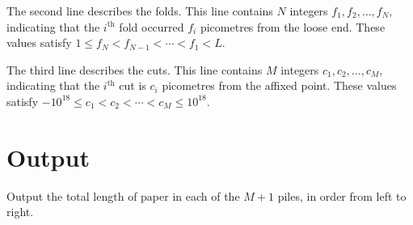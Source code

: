 The second line describes the folds. This line contains $N$ integers
$f_1, f_2, \ldots, f_N$, indicating that the $i^\textrm{th}$ fold occurred $f_i$ picometres from the loose end. These values satisfy $1 \leq f_N < f_{N-1} < \cdots < f_1 < L$.

The third line describes the cuts. This line contains $M$ integers
$c_1, c_2, \ldots, c_M$, indicating that the $i^\textrm{th}$ cut is $c_i$ picometres from the affixed point. These values satisfy $-10^{18} \leq c_1 < c_2 < \cdots < c_M \leq 10^{18}$.

\section*{Output}
Output the total length of paper in each of the $M+1$ piles, in order from left to right.
